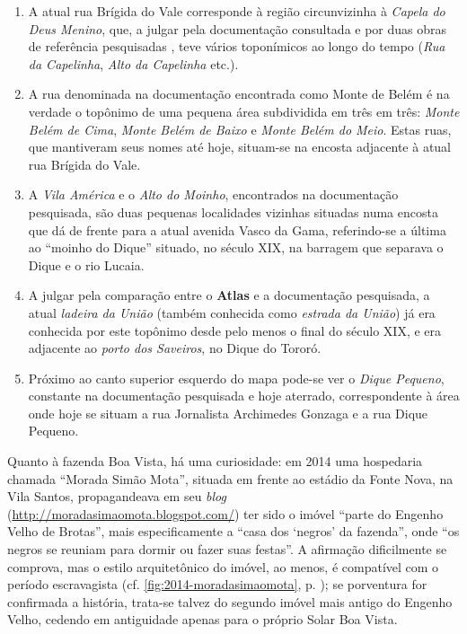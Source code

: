 \begin{enumerate}
\item A atual rua Brígida do Vale corresponde à região circunvizinha à \textit{Capela do Deus Menino}, que, a julgar pela documentação consultada e por duas obras de referência pesquisadas \cite{municipal_atlas_1955,souza_guia_1935}, teve vários toponímicos ao longo do tempo (\textit{Rua da Capelinha}, \textit{Alto da Capelinha} etc.).
\item A rua denominada na documentação encontrada como Monte de Belém é na verdade o topônimo de uma pequena área subdividida em três em três: \textit{Monte Belém de Cima}, \textit{Monte Belém de Baixo} e \textit{Monte Belém do Meio}. Estas ruas, que mantiveram seus nomes até hoje, situam-se na encosta adjacente à atual rua Brígida do Vale.
\item A \textit{Vila América} e o \textit{Alto do Moinho}, encontrados na documentação pesquisada, são duas pequenas localidades vizinhas situadas numa encosta que dá de frente para a atual avenida Vasco da Gama, referindo-se a última ao ``moinho do Dique'' situado, no século XIX, na barragem que separava o Dique e o rio Lucaia.
\item A julgar pela comparação entre o \textbf{Atlas} e a documentação pesquisada, a atual \textit{ladeira da União} (também conhecida como \textit{estrada da União}) já era conhecida por este topônimo desde pelo menos o final do século XIX, e era adjacente ao \textit{porto dos Saveiros}, no Dique do Tororó.
\item Próximo ao canto superior esquerdo do mapa pode-se ver o \textit{Dique Pequeno}, constante na documentação pesquisada e hoje aterrado, correspondente à área onde hoje se situam a rua Jornalista Archimedes Gonzaga e a rua Dique Pequeno.
\end{enumerate}

Quanto à fazenda Boa Vista, há uma curiosidade: em 2014 uma hospedaria chamada ``Morada Simão Mota'', situada em frente ao estádio da Fonte Nova, na Vila Santos, propagandeava em seu \textit{blog} (\url{http://moradasimaomota.blogspot.com/}) ter sido o imóvel ``parte do Engenho Velho de Brotas'', mais especificamente a ``casa dos `negros' da fazenda'', onde ``os negros se reuniam para dormir ou fazer suas festas''. A afirmação dificilmente se comprova, mas o estilo arquitetônico do imóvel, ao menos, é compatível com o período escravagista (cf. \autoref{fig:2014-moradasimaomota}, p. \pageref{fig:2014-moradasimaomota}); se porventura for confirmada a história, trata-se talvez do segundo imóvel mais antigo do Engenho Velho, cedendo em antiguidade apenas para o próprio Solar Boa Vista.


